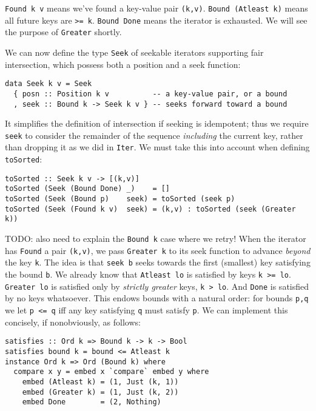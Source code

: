 \documentclass[acmsmall,screen,dvipsnames,svgnames]{acmart}
\newcommand\hask[1]{\texttt{#1}}
\newcommand\ttt\texttt
\newcommand\todo[1]{{\color{Orange}#1}}
\renewcommand\todo[1]{{\color{IndianRed}#1}}
\newcommand\oldtodo[1]{\todo{#1}}
\begin{document}
\noindent
\hask{Found k v} means we've found a key-value pair \ttt{(k,v)}.
\hask{Bound (Atleast k)} means all future keys are \ttt{>= k}.
\hask{Bound Done} means the iterator is exhausted.
We will see the purpose of \hask{Greater} shortly.

We can now define the type \hask{Seek} of seekable iterators supporting fair intersection, which possess both a position and a seek function:

\begin{verbatim}
data Seek k v = Seek
  { posn :: Position k v          -- a key-value pair, or a bound
  , seek :: Bound k -> Seek k v } -- seeks forward toward a bound
\end{verbatim}

\noindent
It simplifies the definition of intersection if seeking is idempotent; thus we require \ttt{seek} to consider the remainder of the sequence \emph{including} the current key, rather than dropping it as we did in \hask{Iter}.
We must take this into account when defining \ttt{toSorted}:

\begin{verbatim}
toSorted :: Seek k v -> [(k,v)]
toSorted (Seek (Bound Done) _)    = []
toSorted (Seek (Bound p)    seek) = toSorted (seek p)
toSorted (Seek (Found k v)  seek) = (k,v) : toSorted (seek (Greater k))
\end{verbatim}

\noindent
\oldtodo{TODO: also need to explain the \hask{Bound k} case where we retry!}
When the iterator has \hask{Found} a pair \ttt{(k,v)}, we pass \hask{Greater k} to its seek function to advance \emph{beyond} the key \ttt{k}.
The idea is that \ttt{seek b} seeks towards the first (smallest) key satisfying the bound \ttt{b}.
We already know that \hask{Atleast lo} is satisfied by keys \ttt{k >= lo}.
\hask{Greater lo} is satisfied only by \emph{strictly greater} keys, \ttt{k > lo}.
And \hask{Done} is satisfied by no keys whatsoever.
This endows bounds with a natural order: for bounds \ttt{p,q} we let \ttt{p <= q} iff any key satisfying \ttt{q} must satisfy \ttt{p}.
We can implement this concisely, if nonobviously, as follows:

\begin{verbatim}
satisfies :: Ord k => Bound k -> k -> Bool
satisfies bound k = bound <= Atleast k
instance Ord k => Ord (Bound k) where
  compare x y = embed x `compare` embed y where
    embed (Atleast k) = (1, Just (k, 1))
    embed (Greater k) = (1, Just (k, 2))
    embed Done        = (2, Nothing)
\end{verbatim}
\end{document}
